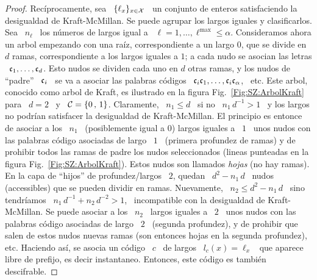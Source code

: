 \begin{proof}
  Rec\'iprocamente, sea  \ $\{ \ell_x  \}_{x \in \mathcal{X}}$  \ un conjunto  de enteros
  satisfaciendo la  desigualdad de Kraft-McMillan.  Se puede  agrupar los largos
  iguales y  clasificarlos. Sea \ $n_\ell$ \  los n\'umeros de largos  igual a \
  $\ell =  1 , \ldots  , \ell^{\max} \le  \alpha$.  Consideramos ahora  un arbol
  empezando con una ra\'iz, correspondiente a un largo $0$, que se divide en $d$
  ramas, correspondiente a los largos iguales  a $1$; a cada nudo se asocian las
  letras \  $\mathfrak{c}_1, \ldots , \mathfrak{c}_d$. Esto  nudos se dividen cada  uno en $d$
  otras  ramas, y  los nudos  de ``padre''  \ $\mathfrak{c}_i$  \ se  va a  asociar las
  palabras c\'odigos \ $\mathfrak{c}_i \mathfrak{c}_1 , \ldots , \mathfrak{c}_i \mathfrak{c}_\alpha$, \ etc.
  Este  arbol,  conocido  como  arbol  de  Kraft,  es  ilustrado  en  la  figura
  Fig.~\ref{Fig:SZ:ArbolKraft}  para \  $d =  2$  \ y  \ $\mathcal{C}  =  \{0 \,  , \,  1
  \}$. Claramente, \ $n_1 \le d$ \ si no \ $n_1 \, d^{-1} > 1$ \ y los largos no
  podr\'ian  satisfacer  la  desigualdad  de Kraft-McMillan.   El  principio  es
  entonce de asociar a los \ $n_1$ \ (posiblemente igual a 0) largos iguales a \
  $1$ \ unos nudos con las palabras c\'odigo asociadas de largo \ $1$ \ (primera
  profundez  de  ramas)  y de  prohibir  todos  las  ramas  de padre  los  nudos
  seleccionados        (lineas        punteadas        en       la        figura
  Fig.~\ref{Fig:SZ:ArbolKraft}). Estos  nudos son  llamados {\em hojas}  (no hay
  ramas).  En  la capa de ``hijos'' de  profundez/largos \ $2$, quedan  \ $d^2 -
  n_1 \, d$ \ nudos (accessibles)  que se pueden dividir en ramas.  Nuevamente, \
  $n_2 \le d^2 - n_1 \, d$ \  sino tendr\'iamos \ $n_1 \, d^{-1} + n_2 \, d^{-2}
  > 1$, \ incompatible con la  desigualdad de Kraft-McMillan. Se puede asociar a
  los \ $n_2$  \ largos iguales a \  $2$ \ unos nudos con  las palabras c\'odigo
  asociadas de  largo \ $2$  \ (segunda profundez),  y de prohibir que  salen de
  estos nudos  nuevas ramas (son entonces  hojas en la  segunda profundez), etc.
  Haciendo as\'i, se asocia un c\'odigo \  $c$ \ de largos \ $l_c(x) = \ell_x$ \
  que aparece libre  de prefijo, es decir instantaneo.   Entonces, este c\'odigo
  es tambi\'en descifrable.
\end{proof}

